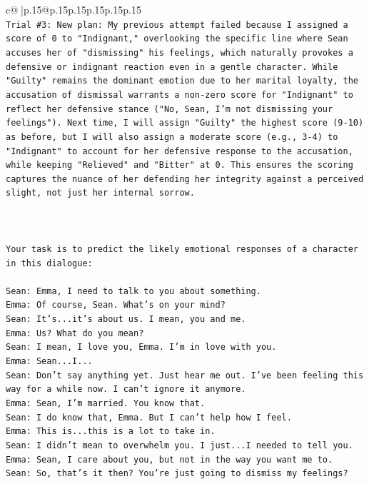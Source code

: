 \documentclass{article}
\begin{document}
{\begin{supertabular}{c@{$\;$}|p{.15\linewidth}@{}p{.15\linewidth}p{.15\linewidth}p{.15\linewidth}p{.15\linewidth}p{.15\linewidth}}
{{{\\ 
\texttt{Trial \#3: New plan: My previous attempt failed because I assigned a score of 0 to "Indignant," overlooking the specific line where Sean accuses her of "dismissing" his feelings, which naturally provokes a defensive or indignant reaction even in a gentle character. While "Guilty" remains the dominant emotion due to her marital loyalty, the accusation of dismissal warrants a non{-}zero score for "Indignant" to reflect her defensive stance ("No, Sean, I'm not dismissing your feelings"). Next time, I will assign "Guilty" the highest score (9{-}10) as before, but I will also assign a moderate score (e.g., 3{-}4) to "Indignant" to account for her defensive response to the accusation, while keeping "Relieved" and "Bitter" at 0. This ensures the scoring captures the nuance of her defending her integrity against a perceived slight, not just her internal sorrow.} \\
\\ 
\\ 
\\ 
\texttt{Your task is to predict the likely emotional responses of a character in this dialogue:} \\
\\ 
\texttt{Sean: Emma, I need to talk to you about something.} \\
\texttt{Emma: Of course, Sean. What's on your mind?} \\
\texttt{Sean: It's...it's about us. I mean, you and me.} \\
\texttt{Emma: Us? What do you mean?} \\
\texttt{Sean: I mean, I love you, Emma. I'm in love with you.} \\
\texttt{Emma: Sean...I...} \\
\texttt{Sean: Don't say anything yet. Just hear me out. I've been feeling this way for a while now. I can't ignore it anymore.} \\
\texttt{Emma: Sean, I'm married. You know that.} \\
\texttt{Sean: I do know that, Emma. But I can't help how I feel.} \\
\texttt{Emma: This is...this is a lot to take in.} \\
\texttt{Sean: I didn't mean to overwhelm you. I just...I needed to tell you.} \\
\texttt{Emma: Sean, I care about you, but not in the way you want me to.} \\
\texttt{Sean: So, that's it then? You're just going to dismiss my feelings?} \\
}}}
\end{supertabular}}
\end{document}
